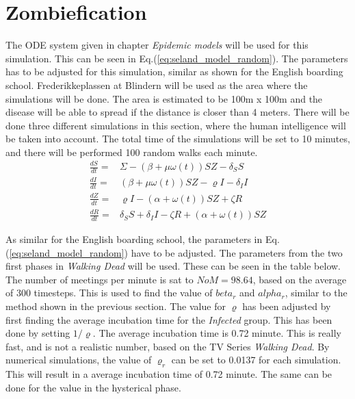 \documentclass[%
twoside,                 %
final,                   %
chapterprefix=true,      %
open=right               %
10pt]{book}
\begin{document}
\section{Zombiefication}
The ODE system given in chapter \emph{Epidemic models} will be used for this simulation. This can be seen in Eq.(\ref{eq:seland_model_random}). The parameters has to be adjusted for this simulation, similar as shown for the English boarding school. Frederikkeplassen at Blindern will be used as the area where the simulations will be done. The area is estimated to be 100m x 100m and the disease will be able to spread if the distance is closer than 4 meters. There will be done three different simulations in this section, where the human intelligence will be taken into account. The total time of the simulations will be set to 10 minutes, and there will be performed 100 random walks each minute.       
\begin{equation} \label{eq:seland_model_random}
    \begin{aligned} 
    \frac{dS}{dt} =& \Sigma -(\beta+\mu \omega(t))SZ - \delta_SS \\
    \frac{dI}{dt} =& (\beta+\mu \omega(t))SZ - \varrho I - \delta_II\\
    \frac{dZ}{dt} =& \varrho I- (\alpha+\omega(t))SZ + \zeta R\\
    \frac{dR}{dt} =& \delta_SS +\delta_II -\zeta R + (\alpha+\omega(t))SZ 
    \end{aligned}
\end{equation}

As similar for the English boarding school, the parameters in Eq.(\ref{eq:seland_model_random}) have to be adjusted. The parameters from the two first phases in \emph{Walking Dead} will be used. These can be seen in the table below. The number of meetings per minute is sat to $NoM = 98.64$, based on the average of 300 timesteps. This is used to find the value of $beta_r$ and $alpha_r$, similar to the method shown in the previous section. The value for $\varrho$ has been adjusted by first finding the average incubation time for the \emph{Infected} group. This has been done by setting $1/\varrho$. The average incubation time is 0.72 minute. This is really fast, and is not a realistic number, based on the TV Series \emph{Walking Dead}. By numerical simulations, the value of $\varrho_r$ can be set to 0.0137 for each simulation. This will result in a average incubation time of 0.72 minute. The same can be done for the value in the hysterical phase.  

\label{table:param_val_random}
\end{document}
